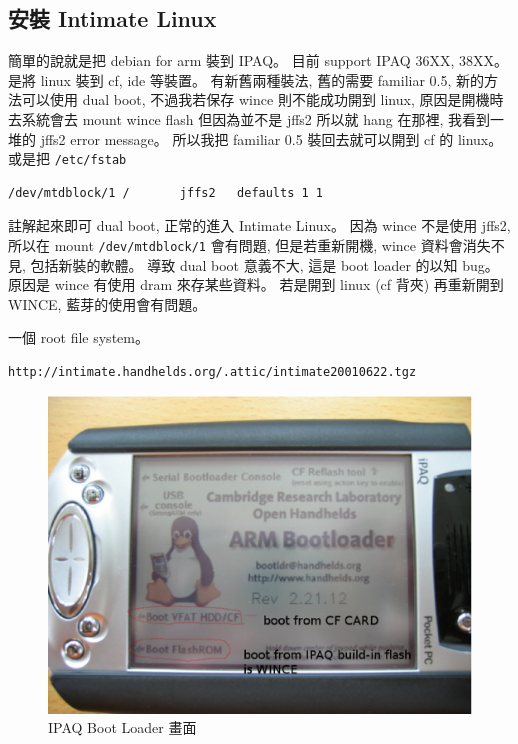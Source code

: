 \documentclass[12pt,a4paper]{article}
\begin{document}
\begin{CJK}{UTF8}{cwmu}
\section{安裝 Intimate Linux}\label{intimate}
簡單的說就是把 debian for arm 裝到 IPAQ。
目前 support IPAQ 36XX, 38XX。
是將 linux 裝到 cf, ide 等裝置。
有新舊兩種裝法, 舊的需要 familiar 0.5,
新的方法可以使用 dual boot,
不過我若保存 wince 則不能成功開到 linux,
原因是開機時去系統會去 mount wince flash 但因為並不是 jffs2 所以就 hang 在那裡,
我看到一堆的 jffs2 error message。
所以我把 familiar 0.5 裝回去就可以開到 cf 的 linux。
或是把 \verb+/etc/fstab+
\begin{verbatim}
/dev/mtdblock/1 /       jffs2   defaults 1 1
\end{verbatim}
註解起來即可 dual boot, 正常的進入 Intimate Linux。
因為 wince 不是使用 jffs2, 所以在 mount \verb+/dev/mtdblock/1+
會有問題, 但是若重新開機, wince 資料會消失不見, 包括新裝的軟體。
導致 dual boot 意義不大, 這是 boot loader 的以知 bug。
原因是 wince 有使用 dram 來存某些資料。
若是開到 linux (cf 背夾) 再重新開到 WINCE,
藍芽的使用會有問題。

一個 root file system。
\begin{verbatim}
http://intimate.handhelds.org/.attic/intimate20010622.tgz 
\end{verbatim}


\begin{figure}[htbp]
\centering
\includegraphics[scale=0.5]{eps/bootloader.eps}
\caption{IPAQ Boot Loader 畫面}
\end{figure}


\end{CJK}
\end{document}
